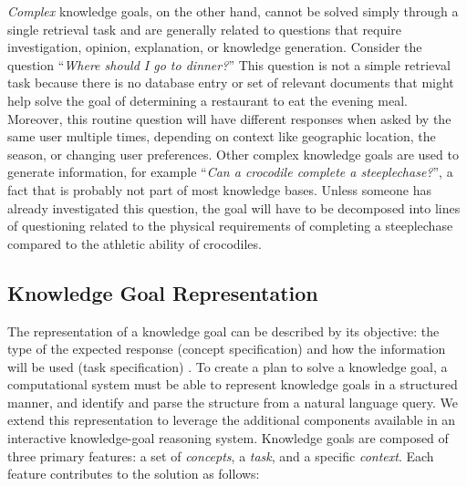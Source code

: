 \documentclass[11pt,letterpaper]{article}
\begin{document}
\textit{Complex} knowledge goals, on the other hand, cannot be solved simply through a single retrieval task and are generally related to questions that require investigation, opinion, explanation, or knowledge generation. Consider the question ``\textit{Where should I go to dinner?}'' This question is not a simple retrieval task because there is no database entry or set of relevant documents that might help solve the goal of determining a restaurant to eat the evening meal. Moreover, this routine question will have different responses when asked by the same user multiple times, depending on context like geographic location, the season, or changing user preferences. Other complex knowledge goals are used to generate information, for example ``\textit{Can a crocodile complete a steeplechase?}'', a fact that is probably not part of most knowledge bases. Unless someone has already investigated this question, the goal will have to be decomposed into lines of questioning related to the physical requirements of completing a steeplechase compared to the athletic ability of crocodiles.


\subsection{Knowledge Goal Representation}

The representation of a knowledge goal can be described by its objective: the type of the expected response (concept specification) and how the information will be used (task specification) \cite{ram_theory_1991}. To create a plan to solve a knowledge goal, a computational system must be able to represent knowledge goals in a structured manner, and identify and parse the structure from a natural language query. We extend this representation to leverage the additional components available in an interactive knowledge-goal reasoning system. Knowledge goals are composed of three primary features: a set of \textit{concepts}, a \textit{task}, and a specific \textit{context}. Each feature contributes to the solution as follows:
\end{document}

